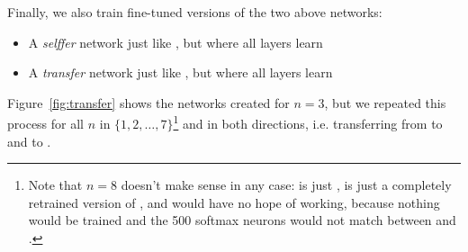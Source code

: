Finally, we also train fine-tuned versions of the two above networks:

\begin{itemize}
\item A \emph{selffer} network  just like , but where all layers learn
\item A \emph{transfer} network  just like , but where all layers learn
\end{itemize}

Figure~\ref{fig:transfer} shows the networks created for $n = 3$, but we repeated this process for all $n$ in $\{1, 2, \ldots, 7\}$\footnote{Note that $n=8$ doesn't make sense in any case:  is just ,  is just a completely retrained version of , and  would have no hope of working, because nothing would be trained and the 500 softmax neurons would not match between \dA and \dB.} and in both directions, i.e. transferring from \dA to \dB and \dB to \dA.


